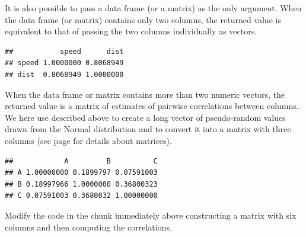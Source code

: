 \documentclass[krantz2]{krantz}\usepackage{knitr}
\begin{document}
It is also possible to pass a data frame (or a matrix) as the only argument. When the data frame (or matrix) contains only two columns, the returned value is equivalent to that of passing the two columns individually as vectors.

\begin{knitrout}\footnotesize
{}\color{fgcolor}\begin{kframe}
\begin{alltt}
\end{alltt}
\begin{verbatim}
##           speed      dist
## speed 1.0000000 0.8068949
## dist  0.8068949 1.0000000
\end{verbatim}
\end{kframe}
\end{knitrout}

When the data frame or matrix contains more than two numeric vectors, the returned value is a matrix of estimates of pairwise correlations between columns. We here use  described above to create a long vector of pseudo-random values drawn from the Normal distribution and  to convert it into a matrix with three columns (see page \pageref{sec:matrix:array} for details about \Rlang matrices).

\begin{knitrout}\footnotesize
{}\color{fgcolor}\begin{kframe}
\begin{alltt}
 \hlkwb{<-} \hlstd{(}\hlstd{(}\hlstd{),}  \hlstd{=} \hlstd{,}
                \hlstd{=} \hlstd{(} \hlstd{=} \hlopt{:}\hlstd{,}  \hlstd{=} \hlstd{(}\hlstd{,} \hlstd{,} \hlstd{)))}
\end{alltt}
\begin{verbatim}
##            A         B          C
## A 1.00000000 0.1899797 0.07591003
## B 0.18997966 1.0000000 0.36800323
## C 0.07591003 0.3680032 1.00000000
\end{verbatim}
\end{kframe}
\end{knitrout}

\begin{playground}
Modify the code in the chunk immediately above constructing a matrix with six columns and then computing the correlations.
\end{playground}
\end{document}
